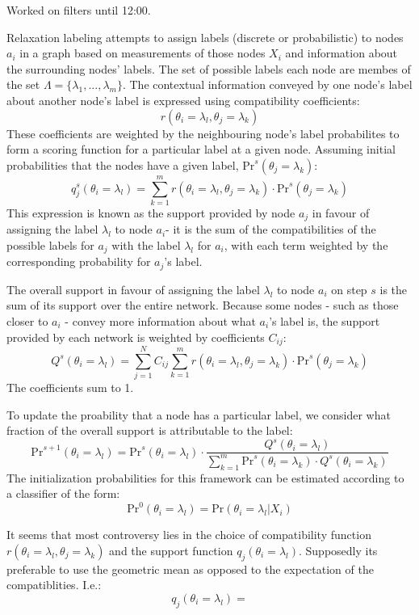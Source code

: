 \documentclass[idxtotoc,hyperref,openany]{labbook} %
\begin{document}
Worked on filters until 12:00.



Relaxation labeling attempts to assign labels (discrete or probabilistic) to nodes $a_i$ in a graph based on measurements of those nodes $X_i$ and information about the surrounding nodes' labels. The set of possible labels each node are membes of the set $\Lambda = \{\lambda_1, ..., \lambda_m\}$. The contextual information conveyed by one node's label about another node's label is expressed using compatibility coefficients:
\[
	r(\theta_i = \lambda_l, \theta_j = \lambda_k)
\]
These coefficients are weighted by the neighbouring node's label probabilites to form a scoring function for a particular label at a given node. Assuming initial probabilities that the nodes have a given label, $\text{Pr}^s(\theta_j = \lambda_k)$:
\[
	q^s_j(\theta_i = \lambda_l) = \sum_{k = 1}^m r(\theta_i = \lambda_l, \theta_j = \lambda_k) \cdot \text{Pr}^s(\theta_j = \lambda_k)
\]
This expression is known as the support provided by node $a_j$ in favour of assigning the label $\lambda_l$ to node $a_i$- it is the sum of the compatibilities of the possible labels for $a_j$ with the label $\lambda_l$ for $a_i$, with each term weighted by the corresponding probability for $a_j$'s label.

The overall support in favour of assigning the label $\lambda_l$ to node $a_i$ on step $s$ is the sum of its support over the entire network. Because some nodes - such as those closer to $a_i$ - convey more information about what $a_i$'s label is, the support provided by each network is weighted by coefficients $C_{ij}$:
\[
	Q^s(\theta_i = \lambda_l) = \sum_{j=1}^N C_{ij} \sum_{k = 1}^m r(\theta_i = \lambda_l, \theta_j = \lambda_k) \cdot \text{Pr}^s(\theta_j = \lambda_k)
\]
The coefficients sum to 1.

To update the proability that a node has a particular label, we consider what fraction of the overall support is attributable to the label:
\[
	\text{Pr}^{s+1}(\theta_i = \lambda_l) = \text{Pr}^s(\theta_i = \lambda_l)\cdot\frac{Q^s(\theta_i = \lambda_l)}{\sum_{k=1}^m \text{Pr}^{s}(\theta_i = \lambda_k)\cdot Q^s(\theta_i = \lambda_k)}
\]
The initialization probabilities for this framework can be estimated according to a classifier of the form:
\[
	\text{Pr}^0(\theta_i = \lambda_l) = \text{Pr}(\theta_i = \lambda_l | X_i)
\]

It seems that most controversy lies in the choice of compatibility function $r(\theta_i = \lambda_l, \theta_j = \lambda_k)$ and the support function $q_j(\theta_i = \lambda_l)$. Supposedly its preferable to use the geometric mean as opposed to the expectation of the compatiblities. I.e.:
\[
	q_j(\theta_i = \lambda_l) = 
\]
\end{document}
